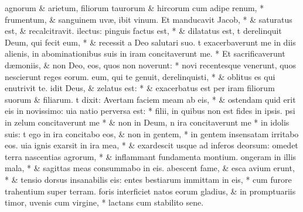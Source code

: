 \documentclass[letter,11pt]{book}
\begin{document}
\begin{multicols}{2}
agnorum \& arietum, filiorum taurorum \& hircorum cum adipe renum, * frumentum, \& sanguinem uv\ae ,
ibit vinum. Et manducavit Jacob, * \& saturatus est, \& recalcitravit.
ilectus: pinguis factus est, * \& dilatatus est,
t derelinquit Deum, qui fecit eum, * \& recessit a Deo salutari suo.
t exacerbaverunt me in diis alienis, in abominationibus suis in iram concitaverunt me. * Et sacrificaverunt d\ae moniis, \& non Deo,
eos, quos non noverunt: * novi recentesque venerunt, quos nescierunt reges eorum.
eum, qui te genuit, derelinquisti, * \& oblitus es qui enutrivit te.
idit Deus, \& zelatus est: * \& exacerbatus est per iram filiorum suorum \& filiarum.
t dixit: Avertam faciem meam ab eis, * \& ostendam quid erit eis in novissimo:
uia natio perversa est: * filii, in quibus non est fides in ipsis.
psi in zelum concitaverunt me * \& non in Deum,
n ira concitaverunt me * in idolis suis:
t ego in ira concitabo eos, \& non in gentem, * in gentem insensatam irritabo eos.
uia ignis exarsit in ira mea, * \& exardescit usque ad inferos deorsum:
omedet terra nascentias agrorum, * \& inflammant fundamenta montium.
ongeram in illis mala, * \& sagittas meas consummabo in eis.
abescent fame, \& esca avium erunt, * \& tensio dorsus insanabilis eis:
entes bestiarum immittam in eis, * cum furore trahentium super terram.
 foris interficiet natos eorum gladius, \& in promptuariis timor,
uvenis cum virgine, * lactans cum stabilito sene.

\end{multicols}
\end{document}
